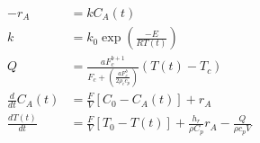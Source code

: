 \begin{equation}
  \begin{aligned}
    - r_{A}               & = kC_{A}(t)
    \\
    k                     & = k_{0} \exp(\frac{-E}{RT(t)})
    \\
    Q                     & = \frac{aF_{c}^{b+1}}{F_{c} + (\frac{aF_{c}^{b}}{2\rho_{c}c_{p}})}(T(t)-T_{c})
    \\
    \frac{d}{dt} C_{A}(t) & = \frac{F}{V}[C_{0} - C_{A}(t)] + r_{A}
    \\
    \frac{dT(t)}{dt}      & = \frac{F}{V} [T_{0}-T(t)] + \frac{h_{r}}{\rho C_{p}}r_{A} - \frac{Q}{\rho c_{p} V}
    \label{eq:CSTR_1storder02_1}
  \end{aligned}
\end{equation}
